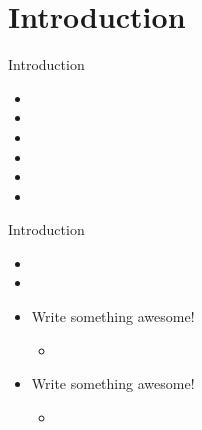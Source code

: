 \section{Introduction}

\begin{frame}{Introduction}{}
\begin{minipage}[t]{0.45\linewidth} 
    \begin{itemize}            
	\item<1-> 
	\item<1-> 
	\item<1-> 
	\item<1-> 
	\item<1-> 
	\item<1-> 
    \end{itemize}           
\end{minipage}
\end{frame}



\begin{frame}{Introduction}{}
 \begin{itemize}            
	\item<1->
	\item<1-> 
	\item<1-> Write something awesome!
		\begin{itemize}  
		\item<1->   
		\end{itemize}  
	\item<1-> Write something awesome!
		\begin{itemize}  
		\item<1-> 
		\end{itemize}  
    \end{itemize} 


\end{frame}